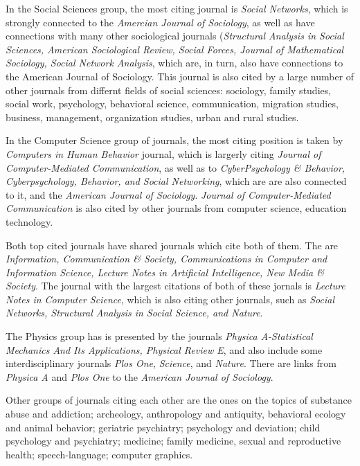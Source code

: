 \documentclass[11pt]{article} %
\begin{document}
In the Social Sciences group, the most citing journal is \textit{Social Networks}, which is strongly connected to the \textit{Amercian Journal of Sociology}, as well as have connections with many other sociological journals (\textit{Structural Analysis in Social Sciences, American Sociological Review, Social Forces, Journal of Mathematical Sociology, Social Network Analysis}, which are, in turn, also have connections to the American Journal of Sociology. This journal is also cited by a large number of other journals from differnt fields of social sciences: sociology, family studies, social work, psychology, behavioral science, communication, migration studies, business, management, organization studies, urban and rural studies. \medskip 

In the Computer Science group of journals, the most citing position is taken by \textit{Computers in Human Behavior} journal, which is largerly citing \textit{Journal of Computer-Mediated Communication}, as well as to \textit{CyberPsychology \& Behavior, Cyberpsychology, Behavior, and Social Networking}, which are are also connected to it, and the \textit{American Journal of Sociology}. \textit{Journal of Computer-Mediated Communication} is also cited by other journals from computer science, education technology. \medskip 

Both top cited journals have shared journals which cite both of them. The are \textit{Information, Communication \& Society, Communications in Computer and Information Science, Lecture Notes in Artificial Intelligence, New Media \& Society}. The journal with the largest citations of both of these jornals is \textit{Lecture Notes in Computer Science}, which is also citing other journals, such as \textit{Social Networks, Structural Analysis in Social Science, and Nature}.\medskip 

The Physics group has is presented by the journals \textit{Physica A-Statistical Mechanics And Its Applications, Physical Review E}, and also include some interdisciplinary journals \textit{Plos One}, \textit{Science}, and \textit{Nature}. There are links from \textit{Physica A} and \textit{Plos One} to  the \textit{American Journal of Sociology}. \medskip  

Other groups of journals citing each other are the ones on the topics of substance abuse and addiction; archeology, anthropology and antiquity, behavioral ecology and animal behavior; geriatric psychiatry; psychology and deviation; child psychology and psychiatry; medicine; family medicine, sexual and reproductive health; speech-language; computer graphics. \medskip  
\end{document}
